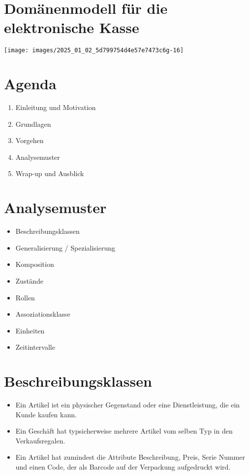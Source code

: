 \documentclass[10pt]{article}
\begin{document}
\section*{Domänenmodell für die elektronische Kasse}
\begin{center}
\texttt{[image: images/2025\_01\_02\_5d799754d4e57e7473c6g-16]}
\end{center}

\section*{Agenda}
\begin{enumerate}
  \item Einleitung und Motivation
  \item Grundlagen
  \item Vorgehen
  \item Analysemuster
  \item Wrap-up und Ausblick
\end{enumerate}

\section*{Analysemuster}
\begin{itemize}
  \item Beschreibungsklassen
  \item Generalisierung / Spezialisierung
  \item Komposition
  \item Zustände
  \item Rollen
  \item Assoziationsklasse
  \item Einheiten
  \item Zeitintervalle
\end{itemize}

\section*{Beschreibungsklassen}
\begin{itemize}
  \item Ein Artikel ist ein physischer Gegenstand oder eine Dienstleistung, die ein Kunde kaufen kann.
  \item Ein Geschäft hat typsicherweise mehrere Artikel vom selben Typ in den Verkaufsregalen.
  \item Ein Artikel hat zumindest die Attribute Beschreibung, Preis, Serie Nummer und einen Code, der als Barcode auf der Verpackung aufgedruckt wird.
\end{itemize}
\end{document}
